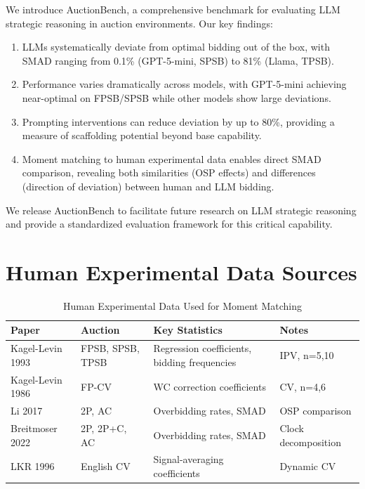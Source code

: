 \documentclass[12pt]{article}
\begin{document}
We introduce AuctionBench, a comprehensive benchmark for evaluating LLM strategic reasoning in auction environments. Our key findings:

\begin{enumerate}
    \item LLMs systematically deviate from optimal bidding out of the box, with SMAD ranging from 0.1\% (GPT-5-mini, SPSB) to 81\% (Llama, TPSB).

    \item Performance varies dramatically across models, with GPT-5-mini achieving near-optimal on FPSB/SPSB while other models show large deviations.

    \item Prompting interventions can reduce deviation by up to 80\%, providing a measure of scaffolding potential beyond base capability.

    \item Moment matching to human experimental data enables direct SMAD comparison, revealing both similarities (OSP effects) and differences (direction of deviation) between human and LLM bidding.
\end{enumerate}

We release AuctionBench to facilitate future research on LLM strategic reasoning and provide a standardized evaluation framework for this critical capability.

\appendix

\section{Human Experimental Data Sources}

\begin{table}[h]
\centering
\caption{Human Experimental Data Used for Moment Matching}
\label{tab:human_data_sources}
\begin{tabular}{lllp{5cm}}
\toprule
Paper & Auction & Key Statistics & Notes \\
\midrule
Kagel-Levin 1993 & FPSB, SPSB, TPSB & Regression coefficients, bidding frequencies & IPV, n=5,10 \\
Kagel-Levin 1986 & FP-CV & WC correction coefficients & CV, n=4,6 \\
Li 2017 & 2P, AC & Overbidding rates, SMAD & OSP comparison \\
Breitmoser 2022 & 2P, 2P+C, AC & Overbidding rates, SMAD & Clock decomposition \\
LKR 1996 & English CV & Signal-averaging coefficients & Dynamic CV \\
\bottomrule
\end{tabular}
\end{table}
\end{document}
